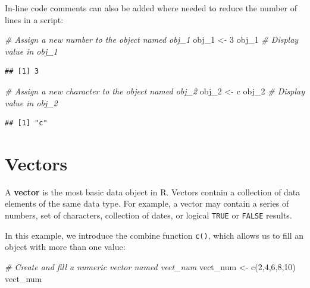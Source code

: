 \documentclass[
]{book}
\newenvironment{Shaded}{\begin{snugshade}}{\end{snugshade}}
\newcommand{\CommentTok}[1]{\textcolor[rgb]{0.56,0.35,0.01}{\textit{#1}}}
\newcommand{\DecValTok}[1]{\textcolor[rgb]{0.00,0.00,0.81}{#1}}
\newcommand{\FunctionTok}[1]{\textcolor[rgb]{0.00,0.00,0.00}{#1}}
\newcommand{\NormalTok}[1]{#1}
\newcommand{\OtherTok}[1]{\textcolor[rgb]{0.56,0.35,0.01}{#1}}
\newcommand{\StringTok}[1]{\textcolor[rgb]{0.31,0.60,0.02}{#1}}
\begin{document}
In-line code comments can also be added where needed to reduce the number of lines in a script:

\begin{Shaded}
\begin{Highlighting}[]
\CommentTok{\# Assign a new number to the object named obj\_1}
\NormalTok{obj\_1 }\OtherTok{\textless{}{-}} \DecValTok{3}
\NormalTok{obj\_1 }\CommentTok{\# Display value in obj\_1}
\end{Highlighting}
\end{Shaded}

\begin{verbatim}
## [1] 3
\end{verbatim}

\begin{Shaded}
\begin{Highlighting}[]
\CommentTok{\# Assign a new character to the object named obj\_2}
\NormalTok{obj\_2 }\OtherTok{\textless{}{-}} \StringTok{\textquotesingle{}c\textquotesingle{}} 
\NormalTok{obj\_2 }\CommentTok{\# Display value in obj\_2}
\end{Highlighting}
\end{Shaded}

\begin{verbatim}
## [1] "c"
\end{verbatim}

\hypertarget{vectors}{%
\section{Vectors}\label{vectors}}

A \textbf{vector} is the most basic data object in R. Vectors contain a collection of data elements of the same data type. For example, a vector may contain a series of numbers, set of characters, collection of dates, or logical \texttt{TRUE} or \texttt{FALSE} results.

In this example, we introduce the combine function \texttt{c()}, which allows us to fill an object with more than one value:

\begin{Shaded}
\begin{Highlighting}[]
\CommentTok{\# Create and fill a numeric vector named vect\_num}
\NormalTok{vect\_num }\OtherTok{\textless{}{-}} \FunctionTok{c}\NormalTok{(}\DecValTok{2}\NormalTok{,}\DecValTok{4}\NormalTok{,}\DecValTok{6}\NormalTok{,}\DecValTok{8}\NormalTok{,}\DecValTok{10}\NormalTok{)}
\NormalTok{vect\_num}
\end{Highlighting}
\end{Shaded}
\end{document}
